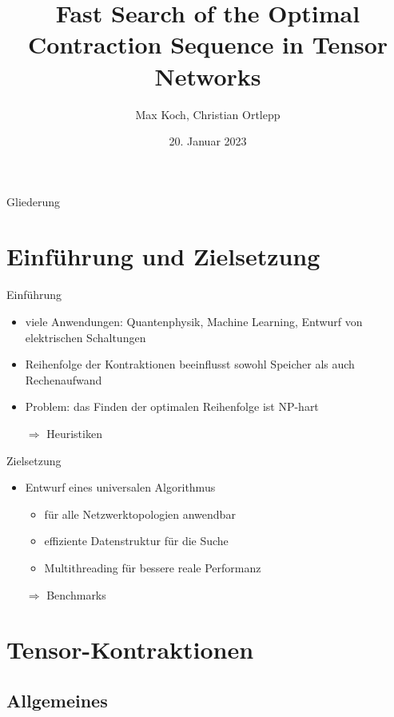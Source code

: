 \documentclass{beamer}
\title{Fast Search of the Optimal Contraction Sequence in Tensor Networks \cite{9325533}}
\author{Max Koch, Christian Ortlepp}
\institute{Friedrich-Schiller-Universität Jena}
\date{20. Januar 2023}
\begin{document}
\begin{frame}
	\titlepage
\end{frame}

\begin{frame}[allowframebreaks=0.8]{Gliederung}
	\tableofcontents
\end{frame}

\section{Einführung und Zielsetzung}
\begin{frame}{Einführung}
	\begin{itemize}
		\item viele Anwendungen: Quantenphysik, Machine Learning, Entwurf von elektrischen Schaltungen
		\item Reihenfolge der Kontraktionen beeinflusst sowohl Speicher als auch Rechenaufwand
		\item Problem: das Finden der optimalen Reihenfolge ist NP-hart
		\item[$\Rightarrow$] Heuristiken
	\end{itemize}
\end{frame}

\begin{frame}{Zielsetzung}
	\begin{itemize}
		\item Entwurf eines universalen Algorithmus \begin{itemize}
				  \item für alle Netzwerktopologien anwendbar
			      \item effiziente Datenstruktur für die Suche
			      \item Multithreading für bessere reale Performanz
		      \end{itemize}
		\item[$\Rightarrow$] Benchmarks
	\end{itemize}
\end{frame}

\section{Tensor-Kontraktionen}
\subsection{Allgemeines}
\end{document}
